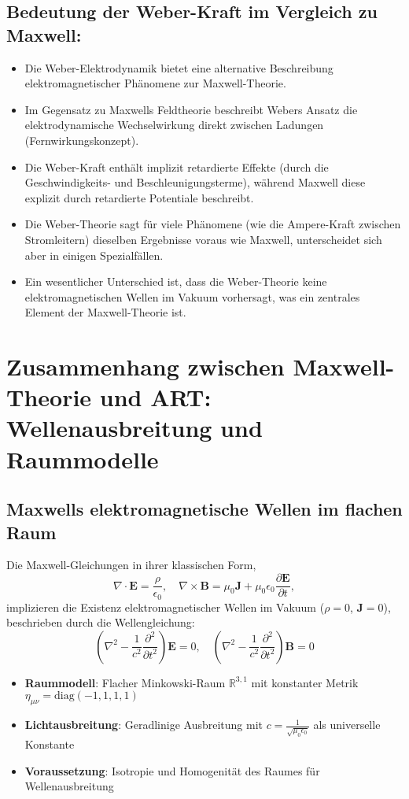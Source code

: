 \subsection*{Bedeutung der Weber-Kraft im Vergleich zu Maxwell:}
\begin{itemize}
    \item Die Weber-Elektrodynamik bietet eine alternative Beschreibung elektromagnetischer Phänomene zur Maxwell-Theorie.
    \item Im Gegensatz zu Maxwells Feldtheorie beschreibt Webers Ansatz die elektrodynamische Wechselwirkung direkt zwischen Ladungen (Fernwirkungskonzept).
    \item Die Weber-Kraft enthält implizit retardierte Effekte (durch die Geschwindigkeits- und Beschleunigungsterme), während Maxwell diese explizit durch retardierte Potentiale beschreibt.
    \item Die Weber-Theorie sagt für viele Phänomene (wie die Ampere-Kraft zwischen Stromleitern) dieselben Ergebnisse voraus wie Maxwell, unterscheidet sich aber in einigen Spezialfällen.
    \item Ein wesentlicher Unterschied ist, dass die Weber-Theorie keine elektromagnetischen Wellen im Vakuum vorhersagt, was ein zentrales Element der Maxwell-Theorie ist.
\end{itemize}

\section{Zusammenhang zwischen Maxwell-Theorie und ART: Wellenausbreitung und Raummodelle}

\subsection{Maxwells elektromagnetische Wellen im flachen Raum}
Die Maxwell-Gleichungen in ihrer klassischen Form,
\[
\nabla \cdot \mathbf{E} = \frac{\rho}{\epsilon_0}, \quad
\nabla \times \mathbf{B} = \mu_0\mathbf{J} + \mu_0\epsilon_0\frac{\partial\mathbf{E}}{\partial t},
\]
implizieren die Existenz elektromagnetischer Wellen im Vakuum ($\rho=0$, $\mathbf{J}=0$), beschrieben durch die Wellengleichung:
\[
\left(\nabla^2 - \frac{1}{c^2}\frac{\partial^2}{\partial t^2}\right)\mathbf{E} = 0, \quad \left(\nabla^2 - \frac{1}{c^2}\frac{\partial^2}{\partial t^2}\right)\mathbf{B} = 0
\]
\begin{itemize}
    \item \textbf{Raummodell}: Flacher Minkowski-Raum $\mathbb{R}^{3,1}$ mit konstanter Metrik $\eta_{\mu\nu} = \mathrm{diag}(-1,1,1,1)$
    \item \textbf{Lichtausbreitung}: Geradlinige Ausbreitung mit $c = \frac{1}{\sqrt{\mu_0\epsilon_0}}$ als universelle Konstante
    \item \textbf{Voraussetzung}: Isotropie und Homogenität des Raumes für Wellenausbreitung
\end{itemize}

